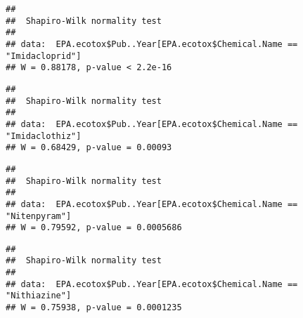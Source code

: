 \documentclass[]{article}
\newenvironment{Shaded}{\begin{snugshade}}{\end{snugshade}}
\newcommand{\KeywordTok}[1]{\textcolor[rgb]{0.13,0.29,0.53}{\textbf{#1}}}
\newcommand{\StringTok}[1]{\textcolor[rgb]{0.31,0.60,0.02}{#1}}
\newcommand{\OperatorTok}[1]{\textcolor[rgb]{0.81,0.36,0.00}{\textbf{#1}}}
\newcommand{\NormalTok}[1]{#1}
\begin{document}
\begin{verbatim}
## 
##  Shapiro-Wilk normality test
## 
## data:  EPA.ecotox$Pub..Year[EPA.ecotox$Chemical.Name == "Imidacloprid"]
## W = 0.88178, p-value < 2.2e-16
\end{verbatim}

\begin{Shaded}
\end{Shaded}

\begin{verbatim}
## 
##  Shapiro-Wilk normality test
## 
## data:  EPA.ecotox$Pub..Year[EPA.ecotox$Chemical.Name == "Imidaclothiz"]
## W = 0.68429, p-value = 0.00093
\end{verbatim}

\begin{Shaded}
\end{Shaded}

\begin{verbatim}
## 
##  Shapiro-Wilk normality test
## 
## data:  EPA.ecotox$Pub..Year[EPA.ecotox$Chemical.Name == "Nitenpyram"]
## W = 0.79592, p-value = 0.0005686
\end{verbatim}

\begin{Shaded}
\end{Shaded}

\begin{verbatim}
## 
##  Shapiro-Wilk normality test
## 
## data:  EPA.ecotox$Pub..Year[EPA.ecotox$Chemical.Name == "Nithiazine"]
## W = 0.75938, p-value = 0.0001235
\end{verbatim}

\begin{Shaded}
\end{Shaded}
\end{document}
